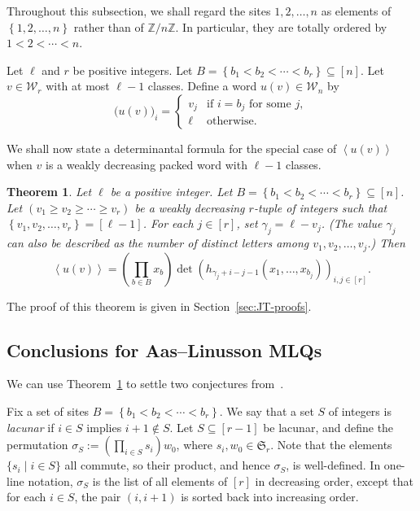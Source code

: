 \documentclass[reqno]{amsart}
\newcommand{\0}{\phantom{c}}
\newcommand{\swt}[1]{\left\langle #1 \right\rangle} %
\newcommand{\SymGp}[1]{\mathfrak{S}_{#1}} %
\newcommand{\mcW}{\mathcal{W}}
\newcommand{\ZZ}{\mathbb{Z}}
\let\prodnonlimits\prod
\renewcommand{\prod}{\prodnonlimits\limits}
\newcommand{\set}[1]{\left\{ #1 \right\}}
\newcommand{\tup}[1]{\left( #1 \right)}
\newcommand{\ive}[1]{\left[ #1 \right]}
\newcommand{\defn}[1]{{\color{darkred}\emph{#1}}} %
\theoremstyle{plain}
\newtheorem{thm}{Theorem}[section]
\theoremstyle{definition}
\numberwithin{equation}{section}
\begin{document}
Throughout this subsection, we shall regard the sites $1, 2, \ldots, n$ as elements of $\set{1, 2, \ldots, n}$ rather than of $\ZZ/n\ZZ$.
In particular, they are totally ordered by $1 < 2 < \cdots < n$.

Let $\ell$ and $r$ be positive integers.
Let $B = \set{ b_1 < b_2 < \cdots < b_r} \subseteq \ive{n}$.
Let $v \in \mcW_r$ with at most $\ell - 1$ classes.
Define a word $u(v) \in \mcW_n$ by
\begin{equation}
\label{eq:weakly_decreasing_construction}
\bigl( u(v) \bigr)_i = \begin{cases}
v_j & \text{if $i = b_j$ for some $j$}, \\
\ell & \text{otherwise}.
\end{cases}
\end{equation}

We shall now state a determinantal formula for the special case of $\swt{u(v)}$ when $v$ is a weakly decreasing packed word with $\ell-1$ classes.

\begin{thm}
\label{thm:determinant_form}
Let $\ell$ be a positive integer.
Let $B = \set{ b_1 < b_2 < \cdots < b_r} \subseteq \ive{n}$.
Let $\tup{v_1 \geq v_2 \geq \cdots \geq v_r}$ be a weakly decreasing $r$-tuple of integers such that $\set{v_1, v_2, \ldots, v_r} = \ive{\ell-1}$.
For each $j \in \ive{r}$, set $\gamma_j = \ell - v_j$.
(The value $\gamma_j$ can also be described as the number of distinct letters among $v_1, v_2, \dotsc, v_j$.)
Then
\[
\swt{u(v)} = \left(  \prod_{b \in B} x_b \right)  \det \left(  h_{\gamma_j+i-j-1}(x_1,\dotsc,x_{b_j}) \right)_{i, j \in \ive{r}}.
\]
\end{thm}

The proof of this theorem is given in Section~\ref{sec:JT-proofs}.




\subsection{Conclusions for Aas--Linusson MLQs}

We can use Theorem~\ref{thm:determinant_form} to settle two conjectures from~\cite{AasLin17}.

Fix a set of sites $B = \set{b_1 < b_2 < \cdots < b_r}$.
We say that a set $S$ of integers is \defn{lacunar} if $i\in S$ implies $i+1 \notin S$.
Let $S \subseteq \ive{r-1}$ be lacunar, and define the permutation $\sigma_S := \left( \prod_{i \in S} s_i \right) w_0$, where $s_i, w_0 \in \SymGp{r}$.
Note that the elements $\{s_i \mid i \in S\}$ all commute, so their product, and hence $\sigma_S$, is well-defined.
In one-line notation, $\sigma_S$ is the list of all elements of $\ive{r}$ in decreasing order, except that for each $i \in S$, the pair $\tup{i, i+1}$ is sorted back into increasing order.
\end{document}
